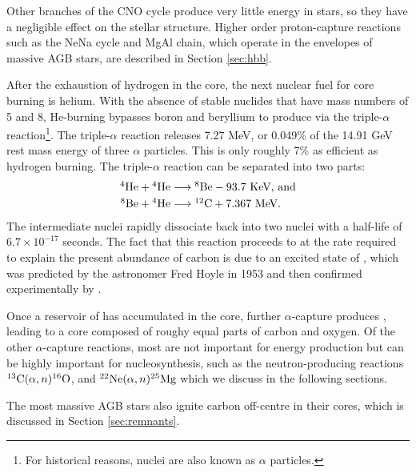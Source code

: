 Other branches of the CNO cycle produce very little energy in stars, so they have a negligible effect on the stellar structure. Higher order proton-capture reactions such as the NeNa cycle and MgAl chain, which operate in the envelopes of massive \gls{AGB} stars, are described in Section \ref{sec:hbb}.

After the exhaustion of hydrogen in the core, the next nuclear fuel for core burning is helium. With the absence of stable nuclides that have mass numbers of 5 and 8, He-burning bypasses boron and beryllium to produce  via the triple-$\alpha$ reaction\footnote{For historical reasons,  nuclei are also known as $\alpha$ particles.}. The triple-$\alpha$ reaction releases 7.27 MeV, or 0.049\% of the 14.91 GeV rest mass energy of three $\alpha$ particles. This is only roughly 7\% as efficient as hydrogen burning. The triple-$\alpha$ reaction can be separated into two parts:
\begin{align*}
	\mbox{${}^{4}{\text{He}}$} + \mbox{${}^{4}{\text{He}}$} &\longrightarrow \mbox{${}^{8}{\text{Be}}$} - 93.7\text{ KeV, and}\\
	\mbox{${}^{8}{\text{Be}}$} + \mbox{${}^{4}{\text{He}}$} &\longrightarrow \mbox{${}^{12}{\text{C}}$} + 7.367\text{ MeV}.
\end{align*}
The intermediate  nuclei rapidly dissociate back into two  nuclei with a half-life of $6.7 \times 10^{-17}$ seconds. The fact that this reaction proceeds to  at the rate required to explain the present abundance of carbon is due to an excited state of , which was predicted by the astronomer Fred Hoyle in 1953 \citep[later published as][]{Hoyle:1954fx} and then confirmed experimentally by \citet{Dunbar:1953em}.

Once a reservoir of  has accumulated in the core, further $\alpha$-capture produces , leading to a core composed of roughy equal parts of carbon and oxygen. Of the other $\alpha$-capture reactions, most are not important for energy production but can be highly important for nucleosynthesis, such as the neutron-producing reactions $\mbox{${}^{13}{\text{C}}$}(\alpha,n)\mbox{${}^{16}{\text{O}}$}$, and $\mbox{${}^{22}{\text{Ne}}$}(\alpha,n)\mbox{${}^{25}{\text{Mg}}$}$ which we discuss in the following sections.

The most massive \gls{AGB} stars also ignite carbon off-centre in their cores, which is discussed in Section \ref{sec:remnants}.

